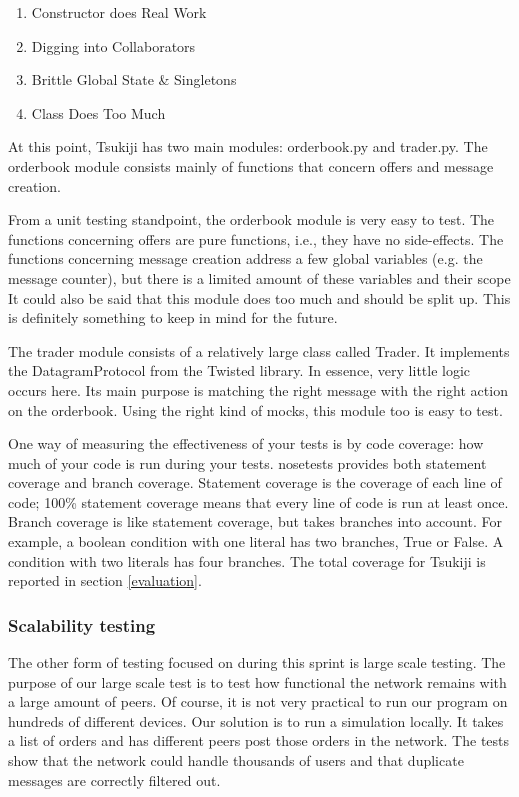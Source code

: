 \begin{enumerate}
\item Constructor does Real Work
\item Digging into Collaborators
\item Brittle Global State \& Singletons
\item Class Does Too Much
\end{enumerate}

At this point, Tsukiji has two main modules: orderbook.py and trader.py.
The orderbook module consists mainly of functions that concern offers and message creation.

From a unit testing standpoint, the orderbook module is very easy to test.
The functions concerning offers are pure functions, i.e., they have no side-effects.
The functions concerning message creation address a few global variables (e.g. the message counter), but there is a limited amount of these variables and their scope
It could also be said that this module does too much and should be split up.
This is definitely something to keep in mind for the future.

The trader module consists of a relatively large class called Trader.
It implements the DatagramProtocol from the Twisted library.
In essence, very little logic occurs here.
Its main purpose is matching the right message with the right action on the orderbook.
Using the right kind of mocks, this module too is easy to test.

One way of measuring the effectiveness of your tests is by code coverage: how much of your code is run during your tests.
nosetests provides both statement coverage and branch coverage.
Statement coverage is the coverage of each line of code; 100\% statement coverage means that every line of code is run at least once.
Branch coverage is like statement coverage, but takes branches into account.
For example, a boolean condition with one literal has two branches, True or False.
A condition with two literals has four branches.
The total coverage for Tsukiji is reported in section \ref{evaluation}.


\subsubsection{Scalability testing}
\label{sprint3:scalability}
The other form of testing focused on during this sprint is large scale testing.
The purpose of our large scale test is to test how functional the network remains with a large amount of peers.
Of course, it is not very practical to run our program on hundreds of different devices.
Our solution is to run a simulation locally.
It takes a list of orders and has different peers post those orders in the network.
The tests show that the network could handle thousands of users and that duplicate messages are correctly filtered out.
